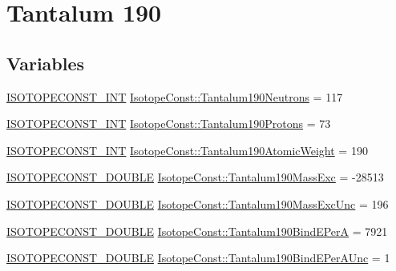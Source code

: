 \hypertarget{group___isotope_const-_tantalum-_ta190}{}\section{Tantalum 190}
\label{group___isotope_const-_tantalum-_ta190}
\subsection*{Variables}
\begin{DoxyCompactItemize}
\item 
\mbox{\hyperlink{group___isotope_const-_macros_ga5f18360b3e99483a35c32d789e62621c}{I\+S\+O\+T\+O\+P\+E\+C\+O\+N\+S\+T\+\_\+\+I\+NT}} \mbox{\hyperlink{group___isotope_const-_tantalum-_ta190_ga855b94d9ea9ec7ef01bf6d171709fdec}{Isotope\+Const\+::\+Tantalum190\+Neutrons}} = 117
\item 
\mbox{\hyperlink{group___isotope_const-_macros_ga5f18360b3e99483a35c32d789e62621c}{I\+S\+O\+T\+O\+P\+E\+C\+O\+N\+S\+T\+\_\+\+I\+NT}} \mbox{\hyperlink{group___isotope_const-_tantalum-_ta190_gac16acd7e86cae8ed29c3229ba3a5f182}{Isotope\+Const\+::\+Tantalum190\+Protons}} = 73
\item 
\mbox{\hyperlink{group___isotope_const-_macros_ga5f18360b3e99483a35c32d789e62621c}{I\+S\+O\+T\+O\+P\+E\+C\+O\+N\+S\+T\+\_\+\+I\+NT}} \mbox{\hyperlink{group___isotope_const-_tantalum-_ta190_gac3435d06329442c9519f5c7ea6eeeb91}{Isotope\+Const\+::\+Tantalum190\+Atomic\+Weight}} = 190
\item 
\mbox{\hyperlink{group___isotope_const-_macros_ga8f45a7272ce02c0b4c65c44636ed719a}{I\+S\+O\+T\+O\+P\+E\+C\+O\+N\+S\+T\+\_\+\+D\+O\+U\+B\+LE}} \mbox{\hyperlink{group___isotope_const-_tantalum-_ta190_ga560f5e161944930704d154cf2fe147cc}{Isotope\+Const\+::\+Tantalum190\+Mass\+Exc}} = -\/28513
\item 
\mbox{\hyperlink{group___isotope_const-_macros_ga8f45a7272ce02c0b4c65c44636ed719a}{I\+S\+O\+T\+O\+P\+E\+C\+O\+N\+S\+T\+\_\+\+D\+O\+U\+B\+LE}} \mbox{\hyperlink{group___isotope_const-_tantalum-_ta190_ga7cc9103e4e7c105048a300f70400562d}{Isotope\+Const\+::\+Tantalum190\+Mass\+Exc\+Unc}} = 196
\item 
\mbox{\hyperlink{group___isotope_const-_macros_ga8f45a7272ce02c0b4c65c44636ed719a}{I\+S\+O\+T\+O\+P\+E\+C\+O\+N\+S\+T\+\_\+\+D\+O\+U\+B\+LE}} \mbox{\hyperlink{group___isotope_const-_tantalum-_ta190_ga36368b6358696ff79d9976edb0a39566}{Isotope\+Const\+::\+Tantalum190\+Bind\+E\+PerA}} = 7921
\item 
\mbox{\hyperlink{group___isotope_const-_macros_ga8f45a7272ce02c0b4c65c44636ed719a}{I\+S\+O\+T\+O\+P\+E\+C\+O\+N\+S\+T\+\_\+\+D\+O\+U\+B\+LE}} \mbox{\hyperlink{group___isotope_const-_tantalum-_ta190_ga65079825347e7fa552be182f2bbe32d9}{Isotope\+Const\+::\+Tantalum190\+Bind\+E\+Per\+A\+Unc}} = 1

\end{DoxyCompactItemize}
